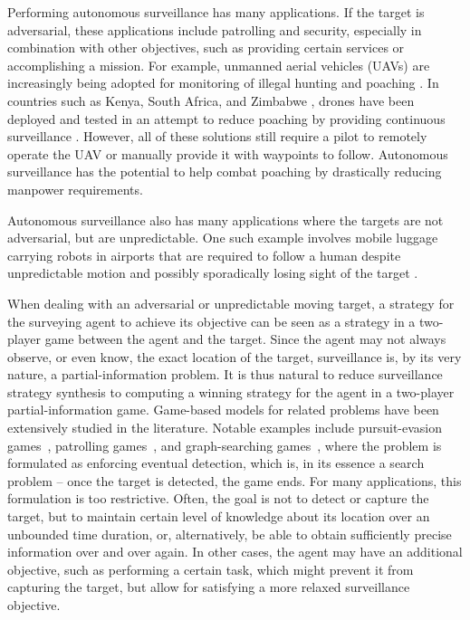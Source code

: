 


Performing autonomous surveillance has many applications. If the target is adversarial, these applications include patrolling and security, especially in combination with other objectives, such as providing certain services or accomplishing a mission. For example, unmanned aerial vehicles (UAVs) are increasingly being adopted for monitoring of illegal hunting and poaching \cite{poaching}. In countries such as Kenya, South Africa, and Zimbabwe \cite{drones}, drones have been deployed and tested in an attempt to reduce poaching by providing continuous surveillance \cite{poaching}. However, all of these solutions still require a pilot to remotely operate the UAV or manually provide it with waypoints to follow. Autonomous surveillance has the potential to help combat poaching by drastically reducing manpower requirements. 

Autonomous surveillance also has many applications where the targets are not adversarial, but are unpredictable. One such example involves mobile luggage carrying robots in airports that are required to follow a human despite unpredictable motion and possibly sporadically losing sight of the target \cite{GonBanos02}. 

When dealing with an adversarial or unpredictable moving target, a strategy for the surveying agent to achieve its objective can be seen as a strategy in a two-player game between the agent and the target. Since the agent may not always observe, or even know, the exact location of the target, surveillance is, by its very nature, a partial-information problem.
It is thus natural to reduce surveillance strategy synthesis to computing a winning strategy for the agent in a two-player partial-information game. Game-based models for related problems have been extensively studied in the literature. Notable examples include pursuit-evasion games~\cite{Chung2011}, patrolling games~\cite{Basilico12}, and graph-searching games~\cite{Kreutzer11}, where the problem is formulated as enforcing eventual detection, which is, in its essence a search problem -- once the target is detected, the game ends. For many applications, this formulation is too restrictive. Often, the goal is not to detect or capture the target, but to maintain certain level of knowledge about its location over an unbounded time duration, or, alternatively, be able to obtain sufficiently precise information over and over again. In other cases, the agent may have an additional objective, such as performing a certain task, which might prevent it from capturing the target, but allow for satisfying a more relaxed surveillance objective.


